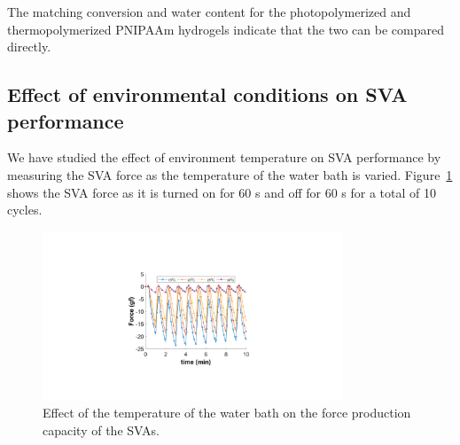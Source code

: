 The matching conversion and water content for the photopolymerized and thermopolymerized PNIPAAm hydrogels indicate that the two can be compared directly.

\subsection{Effect of environmental conditions on SVA performance}
We have studied the effect of environment temperature on SVA performance by measuring the SVA force as the temperature of the water bath is varied. Figure~\ref{fig:envTemp} shows the SVA force as it is turned on for 60 s and off for 60 s for a total of 10 cycles.
\begin{figure}[!ht]
      \centering
      \includegraphics[width=0.8\textwidth]{envTemp.pdf}
      \caption{Effect of the temperature of the water bath on the force production capacity of the SVAs.}
      \label{fig:envTemp}
\end{figure}

